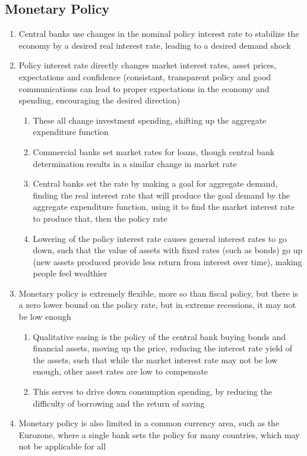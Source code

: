 \subsection{Monetary Policy}
\begin{enumerate}
\item Central banks use changes in the nominal policy interest rate to stabilize the economy by a desired real interest rate, leading to a desired demand shock
\item Policy interest rate directly changes market interest rates, asset prices, expectations and confidence (consistant, transparent policy and good communications can lead to proper expectations in the economy and spending, encouraging the desired direction)
\begin{enumerate}
\item These all change investment spending, shifting up the aggregate expenditure function
\item Commercial banks set market rates for loans, though central bank determination results in a similar change in market rate
\item Central banks set the rate by making a goal for aggregate demand, finding the real interest rate that will produce the goal demand by the aggregate expenditure function, using it to find the market interest rate to produce that, then the policy rate
\item Lowering of the policy interest rate causes general interest rates to go down, such that the value of assets with fixed rates (such as bonds) go up (new assets produced provide less return from interest over time), making people feel wealthier
\end{enumerate}
\item Monetary policy is extremely flexible, more so than fiscal policy, but there is a zero lower bound on the policy rate, but in extreme recessions, it may not be low enough
\begin{enumerate}
\item Qualitative easing is the policy of the central bank buying bonds and financial assets, moving up the price, reducing the interest rate yield of the assets, such that while the market interest rate may not be low enough, other asset rates are low to compensate 
\item This serves to drive down consumption spending, by reducing the difficulty of borrowing and the return of saving
\end{enumerate}
\item Monetary policy is also limited in a common currency area, such as the Eurozone, where a single bank sets the policy for many countries, which may not be applicable for all

\end{enumerate}
